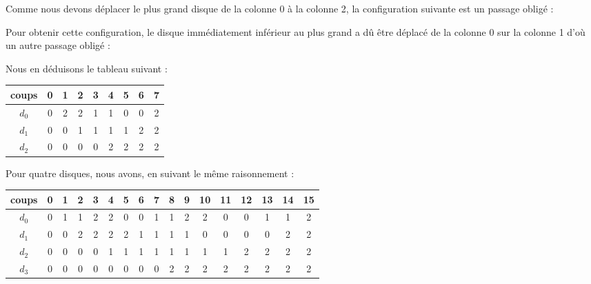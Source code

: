 Comme nous devons déplacer le plus grand disque de la colonne 0 à la colonne 2, la configuration suivante est un passage obligé :
\medskip

\medskip

Pour obtenir cette configuration, le disque immédiatement inférieur au plus grand a dû être déplacé de la colonne 0 sur la colonne 1 d'où un autre passage obligé :
\medskip

\medskip

Nous en déduisons le tableau suivant :
\medskip

\begin{tabular}{| c || c | c | c | c | c | c | c | c |}
    \hline
    coups & 0 & 1 & 2 & 3 & 4 & 5 & 6 & 7 \\
    \hline
    $d_0$ & 0 & 2 & 2 & 1 & 1 & 0 & 0 & 2 \\
    \hline
    $d_1$ & 0 & 0 & 1 & 1 & 1 & 1 & 2 & 2 \\
    \hline
    $d_2$ & 0 & 0 & 0 & 0 & 2 & 2 & 2 & 2 \\
    \hline
\end{tabular}
\medskip

Pour quatre disques, nous avons, en suivant le même raisonnement :
\medskip

\begin{tabular}{| c || c | c | c | c | c | c | c | c | c | c | c | c | c | c | c | c |}
    \hline
    coups & 0 & 1 & 2 & 3 & 4 & 5 & 6 & 7 & 8 & 9 & 10 & 11 & 12 & 13 & 14 & 15 \\
    \hline
    $d_0$ & 0 & 1 & 1 & 2 & 2 & 0 & 0 & 1 & 1 & 2 & 2 & 0 & 0 & 1 & 1 & 2 \\
    \hline
    $d_1$ & 0 & 0 & 2 & 2 & 2 & 2 & 1 & 1 & 1 & 1 & 0 & 0 & 0 & 0 & 2 & 2 \\
    \hline
    $d_2$ & 0 & 0 & 0 & 0 & 1 & 1 & 1 & 1 & 1 & 1 & 1 & 1 & 2 & 2 & 2 & 2 \\
    \hline
    $d_3$ & 0 & 0 & 0 & 0 & 0 & 0 & 0 & 0 & 2 & 2 & 2 & 2 & 2 & 2 & 2 & 2 \\
    \hline
\end{tabular}

